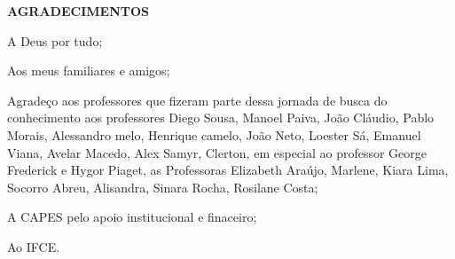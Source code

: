 \begin{center}
	    \textbf{AGRADECIMENTOS}
	\end{center}
	\par
        A Deus por tudo;
    \par
        Aos meus familiares e amigos;
    \par
        Agradeço aos professores que fizeram parte dessa jornada de busca do conhecimento aos professores Diego Sousa, Manoel Paiva, João Cláudio, Pablo Morais, Alessandro melo, Henrique camelo, João Neto, Loester Sá, Emanuel Viana, Avelar Macedo, Alex Samyr, Clerton, em especial ao professor George Frederick e Hygor Piaget, as Professoras Elizabeth Araújo, Marlene, Kiara Lima, Socorro Abreu, Alisandra, Sinara Rocha, Rosilane Costa;
    \par
        A CAPES pelo apoio institucional e finaceiro;
    \par
        Ao IFCE.
	\newpage